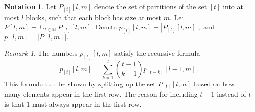 \documentclass[10 pt]{amsart}
\theoremstyle{plain}
\theoremstyle{definition}
\newtheorem{note}[thm]{Notation}
\theoremstyle{remark}
\newtheorem{rem}[thm]{Remark}
\numberwithin{equation}{section}
\newcommand\BN{{\mathbb N}}
\begin{document}
\begin{note}
Let $P_{[t]}[l,m]$ denote the set of partitions of the set $[t]$ into at most $l$ blocks, such that each block has size at most $m.$ Let $P[l,m] = \cup_{t \in \BN} P_{[t]}[l,m].$ Denote $p_{[t]}[l,m] = |P_{[t]}[l,m]|,$ and $p[l,m] = |P[l,m]|.$
\end{note}

\begin{rem}
The numbers $p_{[t]}[l,m]$ satisfy the recursive formula
$$p_{[t]}[l,m] = \sum_{k=1}^l \binom {t-1} {k-1} p_{[t-k]}[l-1,m].$$
This formula can be shown by splitting up the set $P_{[t]}[l,m]$ based on how many elements appear in the first row. The reason for including $t-1$ instead of $t$ is that $1$ must always appear in the first row.
\end{rem}
\end{document}

